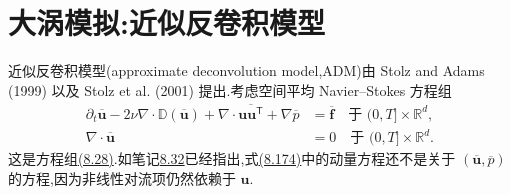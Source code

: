 \section{大涡模拟:近似反卷积模型}
\label{sec:les-approximate-deconvolution}

\begin{note}[基本思想]
\label{note:les-adm-basic-idea}
近似反卷积模型(approximate deconvolution model,ADM)由 Stolz and Adams (1999) 以及 Stolz et al. (2001) 提出.考虑空间平均 Navier--Stokes 方程组
\begin{equation}\label{eq:les-adm-filtered-ns}
\begin{aligned}
 \partial_t\overline{\bm{u}}
 -2\nu\nabla\cdot\mathbb{D}(\overline{\bm{u}})
 +\nabla\cdot\overline{\bm{u}\bm{u}^{\mathsf T}}
 +\nabla\overline{p}
 &=\overline{\bm{f}}
 \quad\text{于 }(0,T]\times\mathbb{R}^d,\\
 \nabla\cdot\overline{\bm{u}}&=0
 \quad\text{于 }(0,T]\times\mathbb{R}^d.
\end{aligned}
\end{equation}
这是方程组\hyperref[eq:space-averaged-navier-stokes-full-space]{(8.28)}.如笔记\hyperref[note:les-closure-problem]{8.32}已经指出,式\hyperref[eq:les-adm-filtered-ns]{(8.174)}中的动量方程还不是关于 $(\overline{\bm{u}},\overline{p})$ 的方程,因为非线性对流项仍然依赖于 $\bm{u}$.


\end{note}
